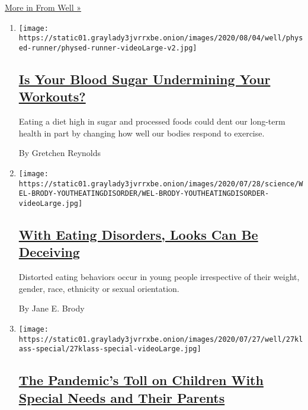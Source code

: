 \href{/section/well}{More in From Well »}

\begin{enumerate}
\def\labelenumi{\arabic{enumi}.}
\item
  \texttt{[image: https://static01.graylady3jvrrxbe.onion/images/2020/08/04/well/physed-runner/physed-runner-videoLarge-v2.jpg]}

  \hypertarget{is-your-blood-sugar-undermining-your-workouts}{%
  \subsection{\texorpdfstring{\href{/2020/07/29/well/move/blood-sugar-diet-foods-workouts-exercise-muscles.html}{Is
  Your Blood Sugar Undermining Your
  Workouts?}}{Is Your Blood Sugar Undermining Your Workouts?}}\label{is-your-blood-sugar-undermining-your-workouts}}

  Eating a diet high in sugar and processed foods could dent our
  long-term health in part by changing how well our bodies respond to
  exercise.

  By Gretchen Reynolds
\item
  \texttt{[image: https://static01.graylady3jvrrxbe.onion/images/2020/07/28/science/WEL-BRODY-YOUTHEATINGDISORDER/WEL-BRODY-YOUTHEATINGDISORDER-videoLarge.jpg]}

  \hypertarget{with-eating-disorders-looks-can-be-deceiving}{%
  \subsection{\texorpdfstring{\href{/2020/07/27/well/eat/eating-disorders.html}{With
  Eating Disorders, Looks Can Be
  Deceiving}}{With Eating Disorders, Looks Can Be Deceiving}}\label{with-eating-disorders-looks-can-be-deceiving}}

  Distorted eating behaviors occur in young people irrespective of their
  weight, gender, race, ethnicity or sexual orientation.

  By Jane E. Brody
\item
  \texttt{[image: https://static01.graylady3jvrrxbe.onion/images/2020/07/27/well/27klass-special/27klass-special-videoLarge.jpg]}

  \hypertarget{the-pandemics-toll-on-children-with-special-needs-and-their-parents}{%
  \subsection{\texorpdfstring{\href{/2020/07/27/well/family/children-special-needs-pandemic.html}{The
  Pandemic's Toll on Children With Special Needs and Their
  Parents}}{The Pandemic's Toll on Children With Special Needs and Their Parents}}\label{the-pandemics-toll-on-children-with-special-needs-and-their-parents}}


\end{enumerate}
